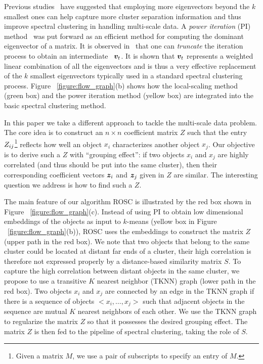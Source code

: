 Previous studies~\cite{alpert1995spectral,ye2016fuse} have suggested that employing more eigenvectors beyond the $k$ smallest ones
can help capture more cluster separation information and thus improve spectral clustering in handling multi-scale data.
A {\it power iteration} (PI) method~\cite{saad2011numerical} was put forward as an efficient method for computing the
dominant eigenvector of a matrix. 
It is observed in~\cite{lin2010power} that one can
{\it truncate} the iteration process to obtain an 
intermediate \pev\ ${\bm v}_t$.
It is shown that ${\bm v}_t$ represents a weighted linear combination of all the eigenvectors and is thus
a very effective replacement of the $k$ smallest eigenvectors typically used in a standard spectral
clustering process. 
Figure ~\ref{figure:flow_graph}(b) shows how the local-scaling method (green box) and the power iteration method (yellow box)
are integrated into the basic spectral clustering method. 

In this paper we take a different approach to tackle the multi-scale data problem. 
The core idea is to construct an $n \times n$  coefficient matrix $Z$ such that the entry $Z_{ij}$\footnote{Given a matrix $M$, 
we use a pair of subscripts to specify an entry of $M$.} reflects how well 
an object $x_i$  characterizes another object $x_j$. 
Our objective is to derive such a $Z$ with  ``grouping effect'': 
if two objects $x_i$ and $x_j$ are highly correlated (and thus should be put into the same cluster), 
then their corresponding coefficient vectors 
${\bm z}_i$ and ${\bm z}_j$ given in $Z$ are similar.
The interesting question we address is how to find such a $Z$.

The main feature of our algorithm ROSC is illustrated by the red box shown in Figure ~\ref{figure:flow_graph}(c). 
Instead of using PI to obtain low dimensional embeddings of the objects as input to $k$-means
(yellow box in Figure ~\ref{figure:flow_graph}(b)),
ROSC uses the embeddings to construct the matrix $Z$ (upper path in the red box).
We note that two objects that belong to the same cluster could be located at distant far ends of a cluster,
their high correlation is therefore not expressed properly by a distance-based similarity matrix $S$.
To capture the high correlation between distant objects in the same cluster,
we propose to use a transitive $K$ nearest neighbor (TKNN) graph (lower path in the red box). 
Two objects $x_i$ and $x_j$ are connected by an edge in the TKNN graph
if there is a sequence of objects $<x_i, \ldots, x_j>$ such that adjacent objects in the sequence 
are mutual $K$ nearest neighbors of each other. 
We use the TKNN graph to regularize the matrix $Z$ so that it possesses the desired grouping effect.
The matrix $Z$ is then fed to the pipeline of spectral clustering, taking the role of $S$.

